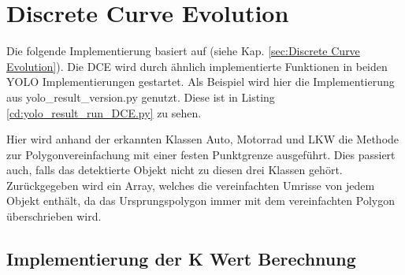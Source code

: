 \section{Discrete Curve Evolution}{
	\label{py:DCE}
	Die folgende Implementierung basiert auf \citeauthor{Barkowsky2000} \citep{Barkowsky2000} (siehe Kap. \ref{sec:Discrete Curve Evolution}). Die DCE wird durch ähnlich implementierte Funktionen in beiden YOLO Implementierungen gestartet. Als Beispiel wird hier die Implementierung aus yolo\_result\_version.py genutzt. \ifimportant Diese ist in Listing \ref{cd:yolo_result_run_DCE.py} zu sehen. \fi \\
	\ifimportant
	
	\fi

	Hier wird anhand der erkannten Klassen Auto, Motorrad und LKW die Methode zur Polygonvereinfachung mit einer festen Punktgrenze ausgeführt. Dies passiert auch, falls das detektierte Objekt nicht zu diesen drei Klassen gehört. \\ 
	Zurückgegeben wird ein Array, welches die vereinfachten Umrisse von jedem Objekt enthält, da das Ursprungspolygon immer mit dem vereinfachten Polygon überschrieben wird. \\

	\subsection{Implementierung der K Wert Berechnung \label{impl:Calc_K_Val}} 

}
